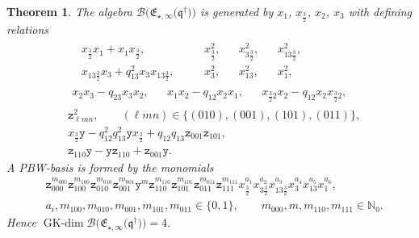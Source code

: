 \documentclass[pdftex]{sigma}
\numberwithin{equation}{section}
\newtheorem{Theorem}{Theorem}[section]
\newcommand{\GK}{\operatorname{GK-dim}}
\newcommand{\toba}{\mathscr B}
\newcommand{\N}{{\mathbb N}}
\newcommand{\yt}{\mathtt{y}}
\newcommand{\zt}{\mathtt{z}}
\newcommand{\eny}{\mathfrak{E}}
\newcommand{\enyIIb}[1]{\eny_{\star,#1}}
\newcommand{\bq}{\mathfrak{q}}
\newcommand{\bqs}{\bq^{\dagger}}
\newcommand{\tresdos}{\frac{3}{2}}
\begin{document}
\begin{Theorem} \label{th:endymion-2pts-case-a}
The algebra $\toba\big(\enyIIb{\infty}\big(\bqs\big) \big)$ is generated by $x_1$, $x_{\tresdos}$, $x_2$, $x_3$ with defining relations
\begin{align}
&\label{eq:endymion-2pts-def-rel-1}
\begin{aligned}
& x_{\tresdos}x_1+x_1x_{\tresdos}, & & x_{\tresdos}^2, & & x_{3\tresdos}^2, & & x_{13\tresdos}^2,
\\
&x_{13\tresdos}x_3+q_{13}^2x_3x_{13\tresdos},\quad & & x_3^2, & & x_{13}^2, & & x_1^2,
\end{aligned}
\\
\label{eq:endymion-2pts-def-rel-2}
& \begin{aligned}
x_2x_3-q_{23}x_3x_2, & & x_1x_2-q_{12}x_2x_1, && x_{\tresdos2}x_2-q_{12}x_2x_{\tresdos2},
\end{aligned}
\\
\label{eq:endymion-2pts-def-rel-3}
& \zt_{\ell mn}^2, \qquad (\ell mn)\in\{(010), (001), (101),(011)\},
\\
\label{eq:endymion-2pts-def-rel-4}
& x_{\tresdos}\yt - q_{12}^2q_{13}^2\yt x_{\tresdos}+q_{12}q_{13}\zt_{001}\zt_{101},
\\
\label{eq:endymion-2pts-def-rel-last}
& \zt_{110}\yt -\yt\zt_{110}+\zt_{001}\yt.
\end{align}
A PBW-basis is formed by the monomials
\begin{align}
&
\zt_{000}^{m_{000}} \zt_{100}^{m_{100}} \zt_{010}^{m_{010}} \zt_{001}^{m_{001}} \yt^m \zt_{110}^{m_{110}} \zt_{101}^{m_{101}} \zt_{011}^{m_{011}} \zt_{111}^{m_{111}}
x_{\tresdos}^{a_1} x_{3\tresdos}^{a_2} x_{13\tresdos}^{a_3} x_3^{a_4} x_{13}^{a_5} x_1^{a_6},
\nonumber\\
& a_i, m_{100}, m_{010}, m_{001}, m_{101},m_{011} \in \{0,1\}, \qquad m_{000}, m, m_{110}, m_{111} \in\N_0.\label{eq:endymion-2pts-case-a-PBW}
\end{align}
Hence $\GK \toba\big(\enyIIb{\infty}\big(\bqs\big)\big) = 4$.
\end{Theorem}
\end{document}
